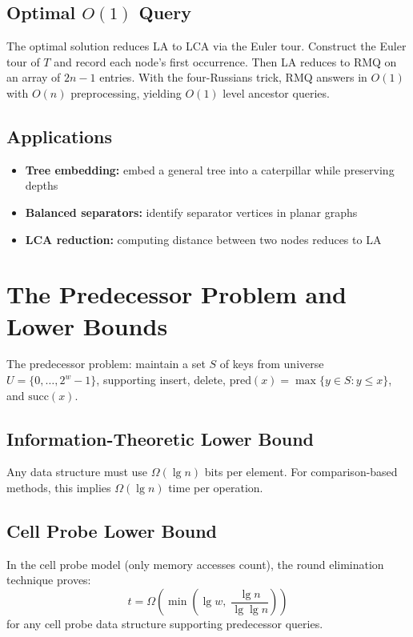 \subsection{Optimal $O(1)$ Query}

The optimal solution reduces LA to LCA via the Euler tour. Construct the Euler tour of $T$ and record each node's first occurrence. Then LA reduces to RMQ on an array of $2n - 1$ entries. With the four-Russians trick, RMQ answers in $O(1)$ with $O(n)$ preprocessing, yielding $O(1)$ level ancestor queries.

\subsection{Applications}

\begin{itemize}
    \item \textbf{Tree embedding:} embed a general tree into a caterpillar while preserving depths
    \item \textbf{Balanced separators:} identify separator vertices in planar graphs
    \item \textbf{LCA reduction:} computing distance between two nodes reduces to LA
\end{itemize}

\section{The Predecessor Problem and Lower Bounds}
\label{sec:predecessor-lower}

The predecessor problem: maintain a set $S$ of keys from universe $U = \{0, \ldots, 2^w - 1\}$, supporting insert, delete, $\text{pred}(x) = \max\{y \in S : y \le x\}$, and $\text{succ}(x)$.

\subsection{Information-Theoretic Lower Bound}

Any data structure must use $\Omega(\lg n)$ bits per element. For comparison-based methods, this implies $\Omega(\lg n)$ time per operation.

\subsection{Cell Probe Lower Bound}

In the cell probe model (only memory accesses count), the round elimination technique proves:
\[
  t = \Omega\!\left(\min\!\left(\lg w,\; \frac{\lg n}{\lg \lg n}\right)\right)
\]
for any cell probe data structure supporting predecessor queries.

